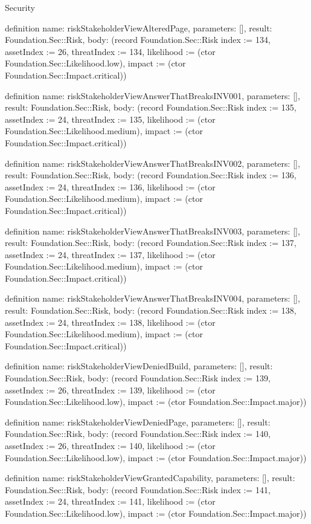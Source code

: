 \begin{lexlean}{Security}
\begin{semanticmodule}
definition{
  name: riskStakeholderViewAlteredPage,
  parameters: [],
  result: Foundation.Sec::Risk,
  body: (record Foundation.Sec::Risk {index := 134, assetIndex := 26, threatIndex := 134, likelihood := (ctor Foundation.Sec::Likelihood.low), impact := (ctor Foundation.Sec::Impact.critical)})
}

definition{
  name: riskStakeholderViewAnswerThatBreaksINV001,
  parameters: [],
  result: Foundation.Sec::Risk,
  body: (record Foundation.Sec::Risk {index := 135, assetIndex := 24, threatIndex := 135, likelihood := (ctor Foundation.Sec::Likelihood.medium), impact := (ctor Foundation.Sec::Impact.critical)})
}

definition{
  name: riskStakeholderViewAnswerThatBreaksINV002,
  parameters: [],
  result: Foundation.Sec::Risk,
  body: (record Foundation.Sec::Risk {index := 136, assetIndex := 24, threatIndex := 136, likelihood := (ctor Foundation.Sec::Likelihood.medium), impact := (ctor Foundation.Sec::Impact.critical)})
}

definition{
  name: riskStakeholderViewAnswerThatBreaksINV003,
  parameters: [],
  result: Foundation.Sec::Risk,
  body: (record Foundation.Sec::Risk {index := 137, assetIndex := 24, threatIndex := 137, likelihood := (ctor Foundation.Sec::Likelihood.medium), impact := (ctor Foundation.Sec::Impact.critical)})
}

definition{
  name: riskStakeholderViewAnswerThatBreaksINV004,
  parameters: [],
  result: Foundation.Sec::Risk,
  body: (record Foundation.Sec::Risk {index := 138, assetIndex := 24, threatIndex := 138, likelihood := (ctor Foundation.Sec::Likelihood.medium), impact := (ctor Foundation.Sec::Impact.critical)})
}

definition{
  name: riskStakeholderViewDeniedBuild,
  parameters: [],
  result: Foundation.Sec::Risk,
  body: (record Foundation.Sec::Risk {index := 139, assetIndex := 26, threatIndex := 139, likelihood := (ctor Foundation.Sec::Likelihood.low), impact := (ctor Foundation.Sec::Impact.major)})
}

definition{
  name: riskStakeholderViewDeniedPage,
  parameters: [],
  result: Foundation.Sec::Risk,
  body: (record Foundation.Sec::Risk {index := 140, assetIndex := 26, threatIndex := 140, likelihood := (ctor Foundation.Sec::Likelihood.low), impact := (ctor Foundation.Sec::Impact.major)})
}

definition{
  name: riskStakeholderViewGrantedCapability,
  parameters: [],
  result: Foundation.Sec::Risk,
  body: (record Foundation.Sec::Risk {index := 141, assetIndex := 24, threatIndex := 141, likelihood := (ctor Foundation.Sec::Likelihood.low), impact := (ctor Foundation.Sec::Impact.major)})
}


\end{semanticmodule}
\end{lexlean}
